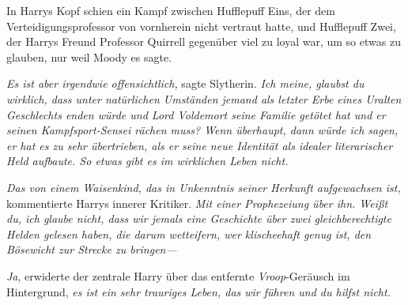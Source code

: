In Harrys Kopf schien ein Kampf zwischen Hufflepuff Eins, der dem Verteidigungsprofessor von vornherein nicht vertraut hatte, und Hufflepuff Zwei, der Harrys Freund Professor Quirrell gegenüber viel zu loyal war, um so etwas zu glauben, nur weil Moody es sagte.

\emph{Es \emph{ist} aber irgendwie offensichtlich,} sagte Slytherin. \emph{Ich meine, glaubst du wirklich, dass unter natürlichen Umständen jemand als letzter Erbe eines Uralten Geschlechts enden würde \emph{und} Lord Voldemort seine Familie getötet hat \emph{und} er seinen Kampfsport-Sensei rächen muss? Wenn überhaupt, dann würde ich sagen, er hat es zu sehr übertrieben, als er seine neue Identität als idealer literarischer Held aufbaute. So etwas gibt es im wirklichen Leben nicht.}

\emph{Das von einem Waisenkind, das in Unkenntnis seiner Herkunft aufgewachsen ist,} kommentierte Harrys innerer Kritiker. \emph{Mit einer Prophezeiung über ihn. Weißt du, ich glaube nicht, dass wir jemals eine Geschichte über zwei gleichberechtigte Helden gelesen haben, die darum wetteifern, wer klischeehaft genug ist, den Bösewicht zur Strecke zu bringen—}

\emph{Ja}, erwiderte der zentrale Harry über das entfernte \emph{Vroop}-Geräusch im Hintergrund, \emph{es ist ein sehr trauriges Leben, das wir führen und \emph{du hilfst nicht}.}

